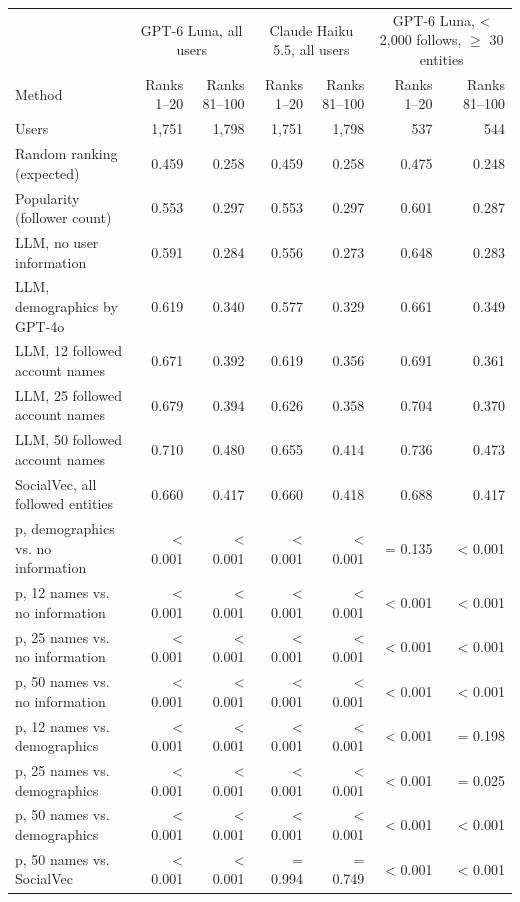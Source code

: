 \begin{tabular}{lrrrrrr}
\toprule
 & \multicolumn{2}{c}{GPT-6 Luna, all users} & \multicolumn{2}{c}{Claude Haiku 5.5, all users} & \multicolumn{2}{c}{GPT-6 Luna, \textless{} 2,000 follows, $\geq$ 30 entities} \\
Method & Ranks 1--20 & Ranks 81--100 & Ranks 1--20 & Ranks 81--100 & Ranks 1--20 & Ranks 81--100 \\
\midrule
Users & 1,751 & 1,798 & 1,751 & 1,798 & 537 & 544 \\
Random ranking (expected) & 0.459 & 0.258 & 0.459 & 0.258 & 0.475 & 0.248 \\
Popularity (follower count) & 0.553 & 0.297 & 0.553 & 0.297 & 0.601 & 0.287 \\
LLM, no user information & 0.591 & 0.284 & 0.556 & 0.273 & 0.648 & 0.283 \\
LLM, demographics by GPT-4o & 0.619 & 0.340 & 0.577 & 0.329 & 0.661 & 0.349 \\
LLM, 12 followed account names & 0.671 & 0.392 & 0.619 & 0.356 & 0.691 & 0.361 \\
LLM, 25 followed account names & 0.679 & 0.394 & 0.626 & 0.358 & 0.704 & 0.370 \\
LLM, 50 followed account names & 0.710 & 0.480 & 0.655 & 0.414 & 0.736 & 0.473 \\
SocialVec, all followed entities & 0.660 & 0.417 & 0.660 & 0.418 & 0.688 & 0.417 \\
p, demographics vs. no information & \textless{} 0.001 & \textless{} 0.001 & \textless{} 0.001 & \textless{} 0.001 & = 0.135 & \textless{} 0.001 \\
p, 12 names vs. no information & \textless{} 0.001 & \textless{} 0.001 & \textless{} 0.001 & \textless{} 0.001 & \textless{} 0.001 & \textless{} 0.001 \\
p, 25 names vs. no information & \textless{} 0.001 & \textless{} 0.001 & \textless{} 0.001 & \textless{} 0.001 & \textless{} 0.001 & \textless{} 0.001 \\
p, 50 names vs. no information & \textless{} 0.001 & \textless{} 0.001 & \textless{} 0.001 & \textless{} 0.001 & \textless{} 0.001 & \textless{} 0.001 \\
p, 12 names vs. demographics & \textless{} 0.001 & \textless{} 0.001 & \textless{} 0.001 & \textless{} 0.001 & \textless{} 0.001 & = 0.198 \\
p, 25 names vs. demographics & \textless{} 0.001 & \textless{} 0.001 & \textless{} 0.001 & \textless{} 0.001 & \textless{} 0.001 & = 0.025 \\
p, 50 names vs. demographics & \textless{} 0.001 & \textless{} 0.001 & \textless{} 0.001 & \textless{} 0.001 & \textless{} 0.001 & \textless{} 0.001 \\
p, 50 names vs. SocialVec & \textless{} 0.001 & \textless{} 0.001 & = 0.994 & = 0.749 & \textless{} 0.001 & \textless{} 0.001 \\
\bottomrule
\end{tabular}

